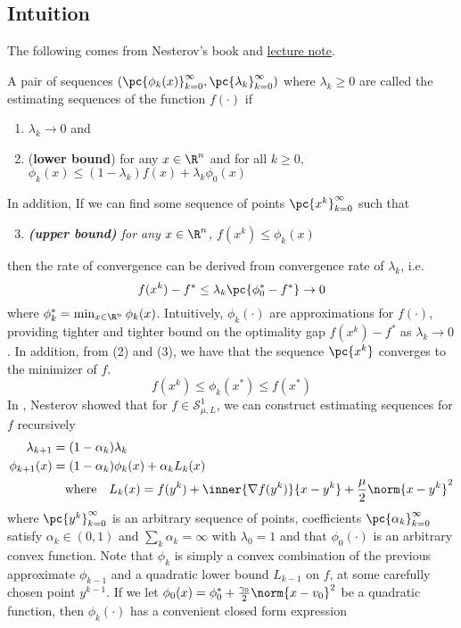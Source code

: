 \documentclass[11pt]{article}
\newcommand\scrS{\ensuremath{\mathscr{S}}}
\begin{document}
\subsection{Intuition}

The following comes from Nesterov's book \cite{nesterovIntroductoryLecturesConvex2004} and \href{https://nisheethvishnoi.files.wordpress.com/2018/05/lecture52.pdf}{lecture note}.
\begin{definition*}
    A pair of sequences $(\pc{\phi_k(x)}_{k=0}^{\infty}, \pc{\lambda_k}_{k=0}^{\infty})$ where $\lambda_k \geq 0$ are called the estimating sequences of the function $f(\cdot)$ if 
    \begin{enumerate}
        \item $\lambda_k \to 0$ and
        \item (\textbf{lower bound}) for any $x\in\R^n$ and for all $k\geq 0$, $\phi_k(x) \leq (1-\lambda_k)f(x) + \lambda_k \phi_0(x)$ 
    \end{enumerate}
\end{definition*}
\noindent In addition, If we can find some sequence of points $\pc{x^k}_{k=0}^{\infty}$ such that
\begin{enumerate}
    \setcounter{enumi}{2}
    \item \textit{\textbf{(upper bound)} for any $x\in\R^n$, $f(x^k) \leq \phi_k(x)$}
\end{enumerate}
then the rate of convergence can be derived from convergence rate of $\lambda_k$, i.e. 
\[
    f(x^k) - f^* \leq \lambda_k \pc{ \phi_0^* - f^* } \to 0
\]
where $\phi_k^* = \min_{x\in\R^n} \phi_k(x)$. Intuitively, $\phi_k(\cdot)$ are approximations for $f(\cdot)$, providing tighter and tighter bound on the optimality gap $f(x^k) - f^*$ as $\lambda_k \to 0$. In addition, from (2) and (3), we have that the sequence $\pc{x^k}$ converges to the minimizer of $f$. 
\[
    f(x^k) \leq \phi_k(x^*) \leq f(x^*)   
\]
In \cite{nesterovIntroductoryLecturesConvex2004}, Nesterov showed that for $f\in\scrS_{\mu,L}^1$, we can construct estimating sequences for $f$ recursively
\begin{align*}
    \lambda_{k+1}
        &= (1-\alpha_k) \lambda_k \\
    \phi_{k+1}(x)
        &= (1-\alpha_k) \phi_k(x) + \alpha_k L_k(x) \\
        &\quad \text{where} \quad 
        L_k(x) = f(y^k) + \inner{\nabla f(y^k)}{x - y^k} + \frac{\mu}{2} \norm{x-y^k}^2
\end{align*}
where $\pc{y^k}_{k=0}^{\infty}$ is an arbitrary sequence of points, coefficients $\pc{\alpha_k}_{k=0}^{\infty}$ satisfy $\alpha_k \in (0,1)$ and $\sum_k \alpha_k = \infty$ with $\lambda_0 = 1$ and that $\phi_0(\cdot)$ is an arbitrary convex function. Note that $\phi_k$ is simply a convex combination of the previous approximate $\phi_{k-1}$ and a quadratic lower bound $L_{k-1}$ on $f$, at some carefully chosen point $y^{k-1}$. If we let $\phi_0(x) = \phi_0^* + \frac{\gamma_0}{2} \norm{x-v_0}^2$ be a quadratic function, then $\phi_k(\cdot)$ has a convenient closed form expression
\end{document}
